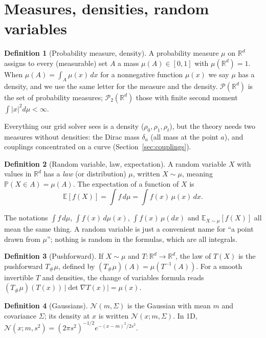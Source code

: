 \documentclass[11pt]{article}
\newcommand{\R}{\mathbb{R}}
\newcommand{\E}{\mathbb{E}}
\newcommand{\Prob}{\mathbb{P}}
\newcommand{\Pc}{\mathcal{P}}
\newcommand{\Nc}{\mathcal{N}}
\theoremstyle{definition}
\newtheorem{definition}{Definition}[section]
\theoremstyle{plain}
\begin{document}
\section{Measures, densities, random variables}
\label{sec:measures}

\begin{definition}[Probability measure, density]
A probability measure $\mu$ on $\R^d$ assigns to every (measurable) set $A$ a mass
$\mu(A)\in[0,1]$ with $\mu(\R^d)=1$. When $\mu(A)=\int_A\mu(x)\,dx$ for a nonnegative
function $\mu(x)$ we say $\mu$ has a density, and we use the same letter for the measure
and the density. $\Pc(\R^d)$ is the set of probability measures; $\Pc_2(\R^d)$ those
with finite second moment $\int|x|^2d\mu<\infty$.
\end{definition}

Everything our grid solver sees is a density ($\rho_0,\rho_1,\rho_t$), but the theory needs
two measures without densities: the Dirac mass $\delta_a$ (all mass at the point $a$),
and couplings concentrated on a curve (Section~\ref{sec:couplings}).

\begin{definition}[Random variable, law, expectation]
A random variable $X$ with values in $\R^d$ has a \emph{law} (or distribution) $\mu$,
written $X\sim\mu$, meaning $\Prob(X\in A)=\mu(A)$. The expectation of a function of $X$ is
\[
  \E[f(X)]=\int f\,d\mu=\int f(x)\,\mu(x)\,dx .
\]
\end{definition}
The notations $\int f\,d\mu$, $\int f(x)\,d\mu(x)$, $\int f(x)\,\mu(dx)$ and $\E_{X\sim\mu}[f(X)]$
all mean the same thing. A random variable is just a convenient name for ``a point drawn
from $\mu$''; nothing is random in the formulas, which are all integrals.

\begin{definition}[Pushforward]
If $X\sim\mu$ and $T:\R^d\to\R^d$, the law of $T(X)$ is the pushforward $T_\#\mu$, defined by
$(T_\#\mu)(A)=\mu(T^{-1}(A))$. For a smooth invertible $T$ and densities, the change of
variables formula reads $(T_\#\mu)(T(x))\,|\det\nabla T(x)|=\mu(x)$.
\end{definition}

\begin{definition}[Gaussians]
$\Nc(m,\Sigma)$ is the Gaussian with mean $m$ and covariance $\Sigma$; its density at $x$ is
written $\Nc(x;m,\Sigma)$. In 1D, $\Nc(x;m,s^2)=(2\pi s^2)^{-1/2}e^{-(x-m)^2/2s^2}$.
\end{definition}
\end{document}
